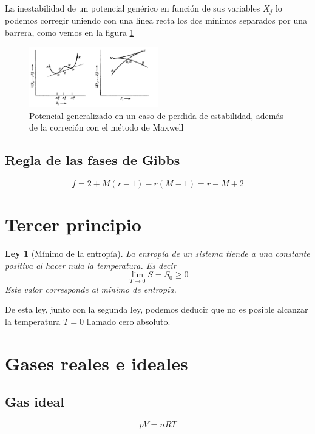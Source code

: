 \documentclass{book}
\numberwithin{equation}{section} %
\newtheorem{law}{Ley}[chapter]
\begin{document}
La inestabilidad de un potencial genérico en función de sus variables $X_j$ lo podemos corregir uniendo con una línea recta los dos mínimos separados por una barrera, como vemos en la figura \ref{fig:fase_potencial}
\begin{figure}[H]
\centering
\includegraphics[width=0.5\textwidth]{fase_potencial}
\caption{Potencial generalizado en un caso de perdida de estabilidad, además de la correción con el método de Maxwell}
\label{fig:fase_potencial}
\end{figure}


\subsection{Regla de las fases de Gibbs}

\begin{equation}
f = 2 + M(r - 1) - r(M - 1) = r - M + 2
\label{eq:regla_gibbs_fase}
\end{equation}


\section{Tercer principio}

\begin{law}[Mínimo de la entropía]
La entropía de un sistema tiende a una constante positiva al hacer nula la temperatura. Es decir
\[\displaystyle\lim_{T \to 0} S = S_0 \geq 0\]
Este valor corresponde al mínimo de entropía.
\end{law}
De esta ley, junto con la segunda ley, podemos deducir que no es posible alcanzar la temperatura $T = 0$ llamado cero absoluto.


\section{Gases reales e ideales}

\subsection{Gas ideal}

\begin{equation}
p V = n R T
\label{eq:gas_ideal_estado}
\end{equation}
\end{document}
